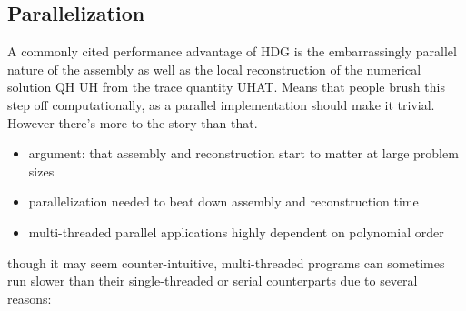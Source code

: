 \subsection{Parallelization}%
\label{sec:computational:parallelization}

A commonly cited performance advantage of HDG is the embarrassingly parallel nature of the assembly as well as the local reconstruction of the numerical solution QH UH from the trace quantity UHAT.
Means that people brush this step off computationally, as a parallel implementation should make it trivial.
However there's more to the story than that.

\begin{itemize}
  \item argument: that assembly and reconstruction start to matter at large problem sizes
  \item parallelization needed to beat down assembly and reconstruction time
  \item multi-threaded parallel applications highly dependent on polynomial order
\end{itemize}

though it may seem counter-intuitive, multi-threaded programs can sometimes run slower than their single-threaded or serial counterparts due to several reasons:

